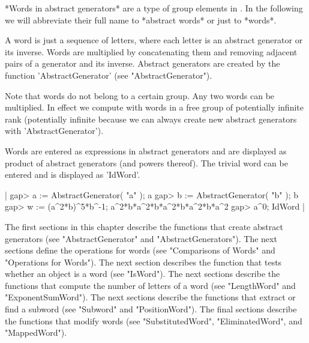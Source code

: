 
*Words in abstract generators* are  a type of group  elements in  {\GAP}.
In the following  we will abbreviate their full name to  *abstract words*
 or just to *words*.

A word  is just a sequence of  letters, where each letter  is an abstract
generator or its inverse.  Words are multiplied by concatenating them and
removing  adjacent  pairs of  a  generator  and  its  inverse.   Abstract
generators  are   created  by  the   function   'AbstractGenerator'  (see
"AbstractGenerator").

Note  that words do not belong to a certain group.  Any two words can  be
multiplied.   In  effect  we  compute with  words  in  a  free  group  of
potentially  infinite  rank (potentially  infinite because we  can always
create new abstract generators with 'AbstractGenerator').

Words are entered as expressions in abstract generators and are displayed
as product of abstract generators (and powers thereof).  The trivial word
can be entered and is displayed as 'IdWord'.

|    gap> a := AbstractGenerator( "a" );
    a
    gap> b := AbstractGenerator( "b" );
    b
    gap> w := (a^2*b)^5*b^-1;
    a^2*b*a^2*b*a^2*b*a^2*b*a^2
    gap> a^0;
    IdWord |

The first  sections in  this chapter describe the functions  that  create
abstract generators  (see  "AbstractGenerator" and "AbstractGenerators").
The next sections define  the  operations for words  (see "Comparisons of
Words"  and  "Operations for  Words").   The next  section describes  the
function that tests whether an object is a word (see "IsWord").  The next
sections describe the  functions  that compute the number of letters of a
word  (see  "LengthWord"   and  "ExponentSumWord").   The  next  sections
describe the functions that extract or find a subword (see  "Subword" and
"PositionWord").  The  final  sections describe the functions that modify
words (see "SubstitutedWord", "EliminatedWord", and "MappedWord").

